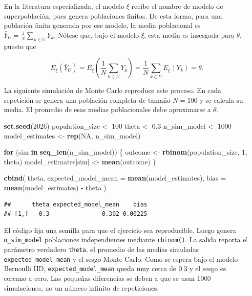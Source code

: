 \documentclass[
  spanish,
  12pt,
]{book}
\newenvironment{Shaded}{\begin{snugshade}}{\end{snugshade}}
\newcommand{\AttributeTok}[1]{\textcolor[rgb]{0.13,0.29,0.53}{#1}}
\newcommand{\ConstantTok}[1]{\textcolor[rgb]{0.56,0.35,0.01}{#1}}
\newcommand{\ControlFlowTok}[1]{\textcolor[rgb]{0.13,0.29,0.53}{\textbf{#1}}}
\newcommand{\DecValTok}[1]{\textcolor[rgb]{0.00,0.00,0.81}{#1}}
\newcommand{\FloatTok}[1]{\textcolor[rgb]{0.00,0.00,0.81}{#1}}
\newcommand{\FunctionTok}[1]{\textcolor[rgb]{0.13,0.29,0.53}{\textbf{#1}}}
\newcommand{\NormalTok}[1]{#1}
\newcommand{\OtherTok}[1]{\textcolor[rgb]{0.56,0.35,0.01}{#1}}
\newcommand{\SpecialCharTok}[1]{\textcolor[rgb]{0.81,0.36,0.00}{\textbf{#1}}}
\begin{document}
En la literatura especializada, el modelo \(\xi\) recibe el nombre de modelo de superpoblación, pues genera poblaciones finitas. De esta forma, para una población finita generada por ese modelo, la media poblacional es \(\bar{Y}_U = \frac{1}{N}\sum_{k \in U}Y_k\). Nótese que, bajo el modelo \(\xi\), esta media es insesgada para \(\theta\), puesto que

\[
E_{\xi}(\bar{Y}_U) =
E_{\xi}\left(\frac{1}{N}\sum_{k \in U}Y_k\right)
= \frac{1}{N}\sum_{k \in U}E_{\xi}(Y_k)
= \theta.
\]

La siguiente simulación de Monte Carlo reproduce este proceso. En cada repetición se genera una población completa de tamaño \(N=100\) y se calcula su media. El promedio de esas medias poblacionales debe aproximarse a \(\theta\).

\begin{Shaded}
\begin{Highlighting}[]
\FunctionTok{set.seed}\NormalTok{(}\DecValTok{2026}\NormalTok{)}
\NormalTok{population\_size }\OtherTok{\textless{}{-}} \DecValTok{100}
\NormalTok{theta }\OtherTok{\textless{}{-}} \FloatTok{0.3}
\NormalTok{n\_sim\_model }\OtherTok{\textless{}{-}} \DecValTok{1000}
\NormalTok{model\_estimates }\OtherTok{\textless{}{-}} \FunctionTok{rep}\NormalTok{(}\ConstantTok{NA}\NormalTok{, n\_sim\_model)}

\ControlFlowTok{for}\NormalTok{ (sim }\ControlFlowTok{in} \FunctionTok{seq\_len}\NormalTok{(n\_sim\_model)) \{}
\NormalTok{  outcome }\OtherTok{\textless{}{-}} \FunctionTok{rbinom}\NormalTok{(population\_size, }\DecValTok{1}\NormalTok{, theta)}
\NormalTok{  model\_estimates[sim] }\OtherTok{\textless{}{-}} \FunctionTok{mean}\NormalTok{(outcome)}
\NormalTok{\}}

\FunctionTok{cbind}\NormalTok{(}
\NormalTok{  theta,}
  \AttributeTok{expected\_model\_mean =} \FunctionTok{mean}\NormalTok{(model\_estimates),}
  \AttributeTok{bias =} \FunctionTok{mean}\NormalTok{(model\_estimates) }\SpecialCharTok{{-}}\NormalTok{ theta}
\NormalTok{)}
\end{Highlighting}
\end{Shaded}

\begin{verbatim}
##      theta expected_model_mean    bias
## [1,]   0.3               0.302 0.00225
\end{verbatim}

El código fija una semilla para que el ejercicio sea reproducible. Luego genera \texttt{n\_sim\_model} poblaciones independientes mediante \texttt{rbinom()}. La salida reporta el parámetro verdadero \texttt{theta}, el promedio de las medias simuladas \texttt{expected\_model\_mean} y el sesgo Monte Carlo. Como se espera bajo el modelo Bernoulli IID, \texttt{expected\_model\_mean} queda muy cerca de 0.3 y el sesgo es cercano a cero. Las pequeñas diferencias se deben a que se usan 1000 simulaciones, no un número infinito de repeticiones.
\end{document}
